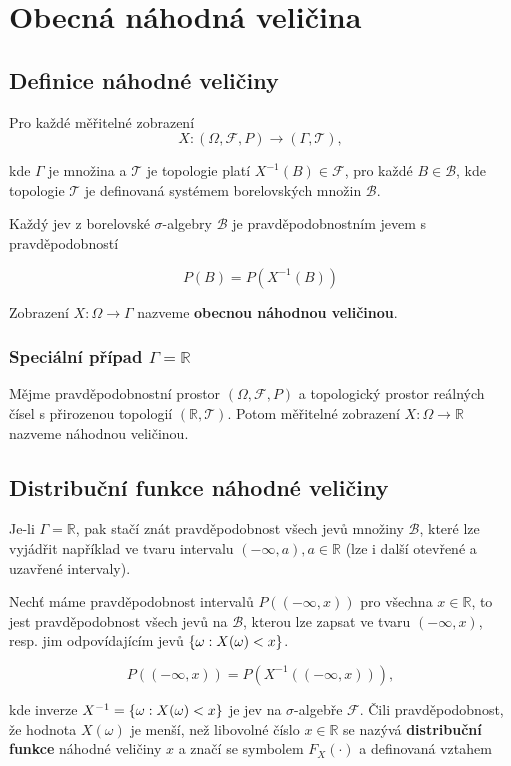 	\section{Obecná náhodná veličina}
	\subsection{Definice náhodné veličiny}
	Pro každé měřitelné zobrazení
	\[ X: (\Omega,\mathscr{F},P)\to(\Gamma,\mathscr{T}), \]

	kde $\Gamma$ je množina a $\mathscr{T}$ je topologie platí $X^{-1}(B)\in\mathscr{F}$, pro každé $B\in\mathscr{B}$, kde topologie $\mathscr{T}$ je definovaná systémem borelovských množin $\mathscr{B}$.\br

	Každý jev z borelovské $\sigma$-algebry $\mathscr{B}$ je pravděpodobnostním jevem s pravděpodobností

	\[ P(B)=P(X^{-1}(B)) \]

	Zobrazení $X:\Omega\to\Gamma$ nazveme \textbf{obecnou náhodnou veličinou}.

	\subsubsection{Speciální případ $\Gamma=\mathbb{R}$}
	Mějme pravděpodobnostní prostor $(\Omega,\mathscr{F},P)$ a topologický prostor reálných čísel s přirozenou topologií $(\mathbb{R},\mathscr{T})$. Potom měřitelné zobrazení $X:\Omega\to\mathbb{R}$ nazveme náhodnou veličinou.

	\subsection{Distribuční funkce náhodné veličiny}
	Je-li $\Gamma=\mathbb{R}$, pak stačí znát pravděpodobnost všech jevů množiny $\mathscr{B}$, které lze vyjádřit například ve tvaru intervalu $(-\infty,a), a\in\mathbb{R}$ (lze i další otevřené a uzavřené intervaly).\br

	Nechť máme pravděpodobnost intervalů $P((-\infty,x))$ pro všechna $x\in\mathbb{R}$, to jest pravděpodobnost všech jevů na $\mathscr{B}$, kterou lze zapsat ve tvaru $(-\infty, x)$, resp. jim odpovídajícím jevů $\left\{\omega: X(\omega)<x\right\}$.

	\[ P((-\infty,x))=P(X^{-1}((-\infty,x))), \]

	kde inverze $X^{-1}=\left\{\omega: X(\omega)<x\right\}$ je jev na $\sigma$-algebře $\mathscr{F}$. Čili pravděpodobnost, že hodnota $X(\omega)$ je menší, než libovolné číslo $x\in\mathbb{R}$ se nazývá \textbf{distribuční funkce} náhodné veličiny $x$ a značí se symbolem $F_X(\cdot)$ a definovaná vztahem

